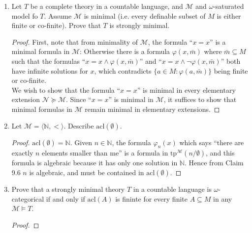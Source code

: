\documentclass{article}
\begin{document}
\begin{enumerate}[label={\bf Q\arabic*:}]
  \item Let $T$ be a complete theory in a countable language, and
    $\mathcal{M}$ and $\omega$-saturated model fo $T$. Assume $\mathcal{M}$
    is minimal (i.e. every definable subset of $M$ is either finite or
    co-finite). Prove that $T$ is strongly minimal.

    \begin{proof}
      First, note that from minimality of $\mathcal{M}$, the formula
      ``$x=x$'' is a minimal formula in $\mathcal{M}$: Otherwise there is a
      formula $\varphi(x,\bar{m})$ where $\bar{m}\subseteq M$ such that the
      formulas ``$x=x\wedge\varphi(x,\bar{m})$'' and
      ``$x=x\wedge\neg\varphi(x,\bar{m})$'' both have infinite solutions
      for $x$, which contradicts $\{a\in M:\varphi(a,\bar{m})\}$ being
      finite or co-finite. \\

      We wish to show that the formula ``$x=x$''  is minimal in every
      elementary extension $\mathcal{N}\succeq\mathcal{M}$. Since ``$x=x$''
      is minimal in $\mathcal{M}$, it suffices to show that minimal
      formulas in $\mathcal{M}$ remain minimal in elementary extensions.
    \end{proof}

  \item Let $\mathcal{M}=\langle\mathbb{N},<\rangle$. Describe
    $\text{acl}(\emptyset)$.

    \begin{proof}
      $\text{acl}(\emptyset)=\mathbb{N}$. Given $n\in\mathbb{N}$, the
      formula $\varphi_n(x)$ which says ``there are exactly $n$ elements
      smaller than me'' is a formula in
      $\text{tp}^\mathcal{M}(n/\emptyset)$, and this formula is algebraic
      because it has only one solution in $\mathbb{N}$. Hence from Claim
      9.6 $n$ is algebraic, and must be contained in
      $\text{acl}(\emptyset)$.
    \end{proof}

  \item Prove that a strongly minimal theory $T$ in a countable language is
    $\omega$-categorical if and only if $\text{acl}(A)$ is fininte for
    every finite $A\subseteq M$ in any $\mathcal{M}\models T$. 

    \begin{proof}
    \end{proof}
\end{enumerate}
\end{document}
